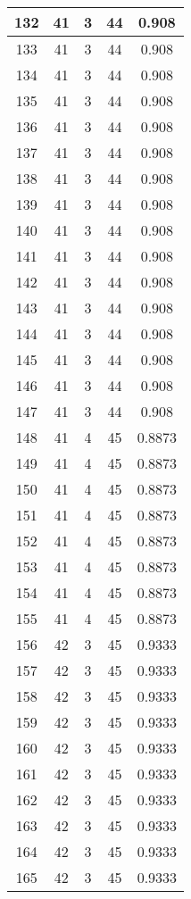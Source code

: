 \documentclass[letterpaper, 12pt]{article}
\begin{document}
\begin{longtable}{|c|c|c|c|c|}
\hline
132 & 41 & 3 & 44 & 0.908 \\
\hline
133 & 41 & 3 & 44 & 0.908 \\
\hline
134 & 41 & 3 & 44 & 0.908 \\
\hline
135 & 41 & 3 & 44 & 0.908 \\
\hline
136 & 41 & 3 & 44 & 0.908 \\
\hline
137 & 41 & 3 & 44 & 0.908 \\
\hline
138 & 41 & 3 & 44 & 0.908 \\
\hline
139 & 41 & 3 & 44 & 0.908 \\
\hline
140 & 41 & 3 & 44 & 0.908 \\
\hline
141 & 41 & 3 & 44 & 0.908 \\
\hline
142 & 41 & 3 & 44 & 0.908 \\
\hline
143 & 41 & 3 & 44 & 0.908 \\
\hline
144 & 41 & 3 & 44 & 0.908 \\
\hline
145 & 41 & 3 & 44 & 0.908 \\
\hline
146 & 41 & 3 & 44 & 0.908 \\
\hline
147 & 41 & 3 & 44 & 0.908 \\
\hline
148 & 41 & 4 & 45 & 0.8873 \\
\hline
149 & 41 & 4 & 45 & 0.8873 \\
\hline
150 & 41 & 4 & 45 & 0.8873 \\
\hline
151 & 41 & 4 & 45 & 0.8873 \\
\hline
152 & 41 & 4 & 45 & 0.8873 \\
\hline
153 & 41 & 4 & 45 & 0.8873 \\
\hline
154 & 41 & 4 & 45 & 0.8873 \\
\hline
155 & 41 & 4 & 45 & 0.8873 \\
\hline
156 & 42 & 3 & 45 & 0.9333 \\
\hline
157 & 42 & 3 & 45 & 0.9333 \\
\hline
158 & 42 & 3 & 45 & 0.9333 \\
\hline
159 & 42 & 3 & 45 & 0.9333 \\
\hline
160 & 42 & 3 & 45 & 0.9333 \\
\hline
161 & 42 & 3 & 45 & 0.9333 \\
\hline
162 & 42 & 3 & 45 & 0.9333 \\
\hline
163 & 42 & 3 & 45 & 0.9333 \\
\hline
164 & 42 & 3 & 45 & 0.9333 \\
\hline
165 & 42 & 3 & 45 & 0.9333 \\

\end{longtable}
\end{document}
